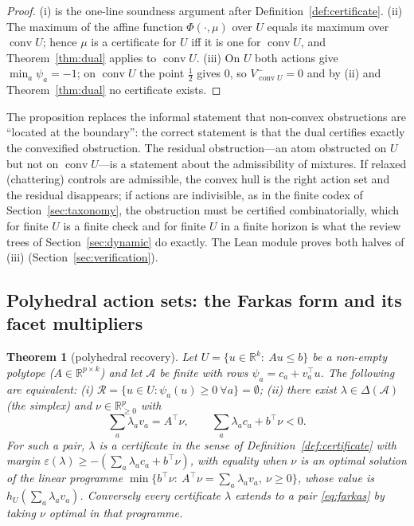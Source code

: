 \documentclass[11pt,a4paper]{article}
\theoremstyle{plain}
\newtheorem{theorem}{Theorem}[section]
\theoremstyle{definition}
\theoremstyle{remark}
\newcommand{\R}{\mathbb{R}}
\newcommand{\calA}{\mathcal{A}}
\newcommand{\calR}{\mathcal{R}}
\newcommand{\conv}{\operatorname{conv}}
\newcommand{\tfr}[2]{\tfrac{#1}{#2}}
\begin{document}
\begin{proof}
(i) is the one-line soundness argument after Definition~\ref{def:certificate}. (ii) The maximum of the affine function $\Phi(\cdot,\mu)$ over $U$ equals its maximum over $\conv U$; hence $\mu$ is a certificate for $U$ iff it is one for $\conv U$, and Theorem~\ref{thm:dual} applies to $\conv U$. (iii) On $U$ both actions give $\min_a\psi_a=-1$; on $\conv U$ the point $\tfr12$ gives $0$, so $V^-_{\conv U}=0$ and by (ii) and Theorem~\ref{thm:dual} no certificate exists.
\end{proof}

The proposition replaces the informal statement that non-convex obstructions are ``located at the boundary'': the correct statement is that the dual certifies exactly the convexified obstruction. The residual obstruction---an atom obstructed on $U$ but not on $\conv U$---is a statement about the admissibility of mixtures. If relaxed (chattering) controls are admissible, the convex hull is the right action set and the residual disappears; if actions are indivisible, as in the finite codex of Section~\ref{sec:taxonomy}, the obstruction must be certified combinatorially, which for finite $U$ is a finite check and for finite $U$ in a finite horizon is what the review trees of Section~\ref{sec:dynamic} do exactly. The Lean module proves both halves of (iii) (Section~\ref{sec:verification}).

\subsection{Polyhedral action sets: the Farkas form and its facet multipliers}

\begin{theorem}[polyhedral recovery]\label{thm:polyhedral}
Let $U=\{u\in\R^k:\ Au\le b\}$ be a non-empty polytope ($A\in\R^{p\times k}$) and let $\calA$ be finite with rows $\psi_a=c_a+v_a^\top u$. The following are equivalent: (i) $\calR=\{u\in U:\psi_a(u)\ge0\ \forall a\}=\emptyset$; (ii) there exist $\lambda\in\Delta(\calA)$ (the simplex) and $\nu\in\R^p_{\ge0}$ with
\begin{equation}\label{eq:farkas}
\sum_a\lambda_av_a=A^\top\nu,\qquad \sum_a\lambda_ac_a+b^\top\nu<0 .
\end{equation}
For such a pair, $\lambda$ is a certificate in the sense of Definition~\ref{def:certificate} with margin $\varepsilon(\lambda)\ge-(\sum_a\lambda_ac_a+b^\top\nu)$, with equality when $\nu$ is an optimal solution of the linear programme $\min\{b^\top\nu:\ A^\top\nu=\sum_a\lambda_av_a,\ \nu\ge0\}$, whose value is $h_U(\sum_a\lambda_av_a)$. Conversely every certificate $\lambda$ extends to a pair \eqref{eq:farkas} by taking $\nu$ optimal in that programme.
\end{theorem}
\end{document}

